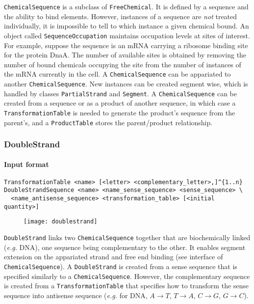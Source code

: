 \texttt{ChemicalSequence} is a subclass of \texttt{FreeChemical}. It is defined by a sequence and the ability to bind elements. However, instances of a sequence are \emph{not} treated individually, it is impossible to tell to which instance a given chemical bound. An object called \texttt{SequenceOccupation} maintains occupation levels at sites of interest. For example, suppose the sequence is an mRNA carrying a ribosome binding site for the protein DnaA. The number of available sites is obtained by removing the number of bound chemicals occupying the site from the number of instances of the mRNA currently in the cell. A \texttt{ChemicalSequence} can be appariated to another \texttt{ChemicalSequence}. New instances can be created segment wise, which is handled by classes \texttt{PartialStrand} and \texttt{Segment}. A \texttt{ChemicalSequence} can be created from a sequence or as a product of another sequence, in which case a \texttt{TransformationTable} is needed to generate the product's sequence from the parent's, and a \texttt{ProductTable} stores the parent/product relationship.

\subsubsection{DoubleStrand}

\paragraph{Input format}
\begin{verbatim}
TransformationTable <name> [<letter> <complementary_letter>,]^{1..n}
DoubleStrandSequence <name> <name_sense_sequence> <sense_sequence> \
  <name_antisense_sequence> <transformation_table> [<initial quantity>]
\end{verbatim}

\begin{figure}[!ht]
	\centering
	\texttt{[image: doublestrand]}
\end{figure}

\texttt{DoubleStrand} links two \texttt{ChemicalSequence} together that are biochemically linked (\textit{e.g.} DNA), one sequence being complementary to the other. It enables segment extension on the appariated strand and free end binding (see interface of \texttt{ChemicalSequence}). A \texttt{DoubleStrand} is created from a sense sequence that is specified similarly to a \texttt{ChemicalSequence}. However, the complementary sequence is created from a \texttt{TransformationTable} that specifies how to transform the sense sequence into antisense sequence (\textit{e.g.} for DNA, $A\rightarrow T$, $T\rightarrow A$, $C\rightarrow G$, $G\rightarrow C$).

